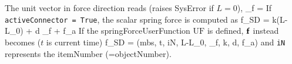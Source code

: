     The unit vector in force direction reads (raises SysError if $L=0$),
    \be
      \vv_{f} =  \Delta\! 
    \ee
    If \texttt{activeConnector = True}, the scalar spring force is computed as
    \be
      f_{SD} = k\cdot(L-L_0) + d \cdot\Delta\! \tp \vv_{f} + f_{a}
    \ee
    If the springForceUserFunction $\mathrm{UF}$ is defined, $\mathbf{f}$ instead becomes ($t$ is current time)
    \be
      f_{SD} = (mbs, t, iN, L-L_0, \Delta\! \tp \vv_{f}, k, d, f_{a})
    \ee
    and \texttt{iN} represents the itemNumber (=objectNumber).

